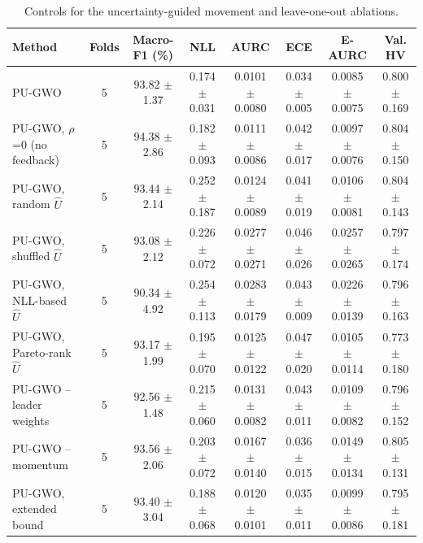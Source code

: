 \begin{table}[t]
\centering
\caption{Controls for the uncertainty-guided movement and leave-one-out ablations.}
\label{tab:table7_controls}
\small
\begin{tabular}{lccccccc}
\toprule
Method & Folds & Macro-F1 (\%) & NLL & AURC & ECE & E-AURC & Val. HV \\
\midrule
PU-GWO & 5 & 93.82 $\pm$ 1.37 & 0.174 $\pm$ 0.031 & 0.0101 $\pm$ 0.0080 & 0.034 $\pm$ 0.005 & 0.0085 $\pm$ 0.0075 & 0.800 $\pm$ 0.169 \\
PU-GWO, $\rho$=0 (no feedback) & 5 & 94.38 $\pm$ 2.86 & 0.182 $\pm$ 0.093 & 0.0111 $\pm$ 0.0086 & 0.042 $\pm$ 0.017 & 0.0097 $\pm$ 0.0076 & 0.804 $\pm$ 0.150 \\
PU-GWO, random $\hat{U}$ & 5 & 93.44 $\pm$ 2.14 & 0.252 $\pm$ 0.187 & 0.0124 $\pm$ 0.0089 & 0.041 $\pm$ 0.019 & 0.0106 $\pm$ 0.0081 & 0.804 $\pm$ 0.143 \\
PU-GWO, shuffled $\hat{U}$ & 5 & 93.08 $\pm$ 2.12 & 0.226 $\pm$ 0.072 & 0.0277 $\pm$ 0.0271 & 0.046 $\pm$ 0.026 & 0.0257 $\pm$ 0.0265 & 0.797 $\pm$ 0.174 \\
PU-GWO, NLL-based $\hat{U}$ & 5 & 90.34 $\pm$ 4.92 & 0.254 $\pm$ 0.113 & 0.0283 $\pm$ 0.0179 & 0.043 $\pm$ 0.009 & 0.0226 $\pm$ 0.0139 & 0.796 $\pm$ 0.163 \\
PU-GWO, Pareto-rank $\hat{U}$ & 5 & 93.17 $\pm$ 1.99 & 0.195 $\pm$ 0.070 & 0.0125 $\pm$ 0.0122 & 0.047 $\pm$ 0.020 & 0.0105 $\pm$ 0.0114 & 0.773 $\pm$ 0.180 \\
PU-GWO -- leader weights & 5 & 92.56 $\pm$ 1.48 & 0.215 $\pm$ 0.060 & 0.0131 $\pm$ 0.0082 & 0.043 $\pm$ 0.011 & 0.0109 $\pm$ 0.0082 & 0.796 $\pm$ 0.152 \\
PU-GWO -- momentum & 5 & 93.56 $\pm$ 2.06 & 0.203 $\pm$ 0.072 & 0.0167 $\pm$ 0.0140 & 0.036 $\pm$ 0.015 & 0.0149 $\pm$ 0.0134 & 0.805 $\pm$ 0.131 \\
PU-GWO, extended bound & 5 & 93.40 $\pm$ 3.04 & 0.188 $\pm$ 0.068 & 0.0120 $\pm$ 0.0101 & 0.035 $\pm$ 0.011 & 0.0099 $\pm$ 0.0086 & 0.795 $\pm$ 0.181 \\
\bottomrule
\end{tabular}
\end{table}
